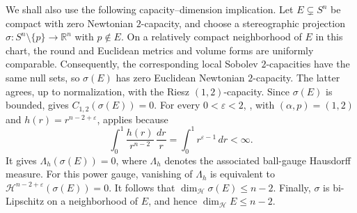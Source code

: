 \documentclass[12pt,oneside,a4paper]{article}
\theoremstyle{mytheorem}
\theoremstyle{remark}
\theoremstyle{definition}
\begin{document}
We shall also use the following capacity--dimension implication. Let
\(E\subsetneq S^n\) be compact with zero Newtonian \(2\)-capacity, and choose a
stereographic projection
\(\sigma\colon S^n\setminus\{p\}\to\mathbb R^n\) with \(p\notin E\). On a
relatively compact neighborhood of \(E\) in this chart, the round and
Euclidean metrics and volume forms are uniformly comparable. Consequently,
the corresponding local Sobolev \(2\)-capacities have the same null sets, so
\(\sigma(E)\) has zero Euclidean Newtonian \(2\)-capacity. The latter agrees,
up to normalization, with the Riesz \((1,2)\)-capacity. Since \(\sigma(E)\)
is bounded, \cite[Proposition~5.1.4(b)]{zbMATH00824833} gives
\(C_{1,2}(\sigma(E))=0\). For every \(0<\varepsilon<2\),
\cite[Theorem~5.1.13]{zbMATH00824833}, with
\((\alpha,p)=(1,2)\) and \(h(r)=r^{n-2+\varepsilon}\), applies because
\[
\int_0^1\frac{h(r)}{r^{n-2}}\,\frac{dr}{r}
=\int_0^1r^{\varepsilon-1}\,dr<\infty.
\]
It gives \(\Lambda_h(\sigma(E))=0\), where \(\Lambda_h\) denotes the
associated ball-gauge Hausdorff measure. For this power gauge, vanishing of
\(\Lambda_h\) is equivalent to
\(\mathcal H^{n-2+\varepsilon}(\sigma(E))=0\). It follows that
\(\dim_{\mathcal H}\sigma(E)\leq n-2\). Finally, \(\sigma\) is bi-Lipschitz
on a neighborhood of \(E\), and hence \(\dim_{\mathcal H}E\leq n-2\).
\end{document}
